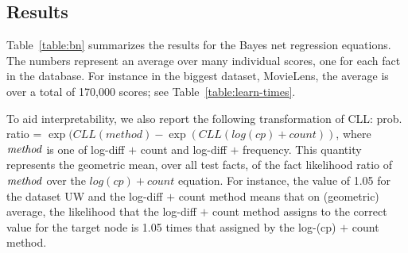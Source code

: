 \documentclass[twoside,11pt]{article}
\begin{document}
\subsection{Results} 

Table~\ref{table:bn} summarizes the results for the Bayes net regression equations. 
The numbers represent an average over many individual scores, one for each fact
in the database. 
For instance in the biggest dataset, MovieLens, the average is over a total of 170,000 scores; see Table~\ref{table:learn-times}. 

To aid interpretability, we also report the following transformation of CLL: prob. ratio = $\exp(CLL(method) - \exp(CLL(log(cp) + count))$,  where $\it{method}$ is one of log-diff $+$ count and log-diff $+$ frequency. This quantity represents the geometric mean, over all test facts, of the fact likelihood ratio of $\it{method}$  over the $log(cp) + count$ equation.
For instance, the value of 1.05 for the dataset UW and the log-diff $+$ count method means that on (geometric) average, the likelihood that the log-diff $+$ count method assigns to the correct value for the target node is 1.05 times that assigned by the log-(cp) $+$ count method.
\end{document}
